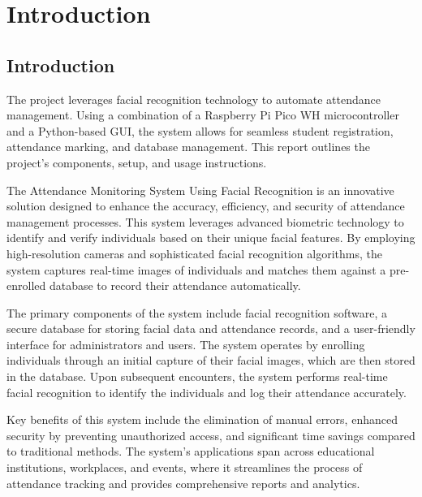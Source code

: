 \documentclass[12pt,a4paper]{report}
\begin{document}
\newpage
\noborders
\tableofcontents
{}

\newpage
\noborders
\listoffigures

\newpage
\noborders
\pagestyle{plain}

\chapter{Introduction}
\section{Introduction}
\par The project leverages facial recognition technology to automate attendance management. Using a combination of a Raspberry Pi Pico WH microcontroller and a Python-based GUI, the system allows for seamless student registration, attendance marking, and database management. This report outlines the project's components, setup, and usage instructions.\\
\par The Attendance Monitoring System Using Facial Recognition is an innovative solution designed to enhance the accuracy, efficiency, and security of attendance management processes. This system leverages advanced biometric technology to identify and verify individuals based on their unique facial features. By employing high-resolution cameras and sophisticated facial recognition algorithms, the system captures real-time images of individuals and matches them against a pre-enrolled database to record their attendance automatically.\\
\par The primary components of the system include facial recognition software, a secure database for storing facial data and attendance records, and a user-friendly interface for administrators and users. The system operates by enrolling individuals through an initial capture of their facial images, which are then stored in the database. Upon subsequent encounters, the system performs real-time facial recognition to identify the individuals and log their attendance accurately.\\
\par Key benefits of this system include the elimination of manual errors, enhanced security by preventing unauthorized access, and significant time savings compared to traditional methods. The system's applications span across educational institutions, workplaces, and events, where it streamlines the process of attendance tracking and provides comprehensive reports and analytics.\\
\end{document}

